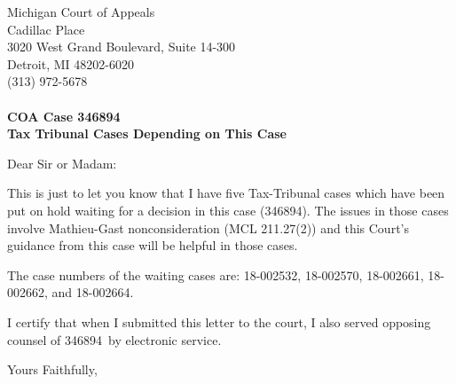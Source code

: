 \documentclass{letter}
\def\coaNo{346894}
\begin{document}
\begin{letter}{Michigan Court of Appeals \\ Cadillac Place \\ 3020 West Grand Boulevard, Suite 14-300 \\ Detroit, MI 48202-6020 \\ (313) 972-5678 %
  \\ ~ \\ \textbf{COA Case \coaNo} \\ \textbf{Tax Tribunal Cases Depending on This Case}}
  
\opening{Dear Sir or Madam:}


This is just to let you know that I have five Tax-Tribunal cases which have been put on hold waiting for a decision in this case (\coaNo). The issues in those cases involve Mathieu-Gast nonconsideration (MCL 211.27(2)) and this Court's guidance from this case will be helpful in those cases.

The case numbers of the waiting cases are: 18-002532, 18-002570, 18-002661, 18-002662, and 18-002664. 

I certify that when I submitted this letter to the court, I also served opposing counsel of \coaNo\ by electronic service.

\closing{Yours Faithfully,}




\end{letter}
\end{document}
